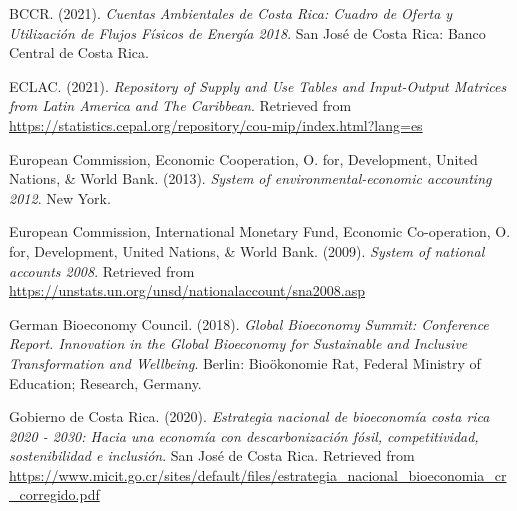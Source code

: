 \documentclass[
  letterpaper,
  DIV=11,
  numbers=noendperiod]{scrartcl}
\newlength{\cslhangindent}
\newenvironment{CSLReferences}[2] %
 {\begin{list}{}{%
  \setlength{\itemindent}{0pt}
  \setlength{\leftmargin}{0pt}
  \setlength{\parsep}{0pt}
  \ifodd #1
   \setlength{\leftmargin}{\cslhangindent}
   \setlength{\itemindent}{-1\cslhangindent}
  \fi
  \setlength{\itemsep}{#2\baselineskip}}}
 {\end{list}}
\begin{document}
\label{refs}
\begin{CSLReferences}{1}{0}
BCCR. (2021). \emph{Cuentas {Ambientales} de {Costa} {Rica}: {Cuadro} de
{Oferta} y {Utilización} de {Flujos} {Físicos} de {Energía} 2018}. San
José de Costa Rica: Banco Central de Costa Rica.

ECLAC. (2021). \emph{{Repository} of {Supply} and {Use Tables} and
{Input-Output Matrices} from {Latin America} and {The Caribbean}}.
Retrieved from
\url{https://statistics.cepal.org/repository/cou-mip/index.html?lang=es}

European Commission, Economic Cooperation, O. for, Development, United
Nations, \& World Bank. (2013). \emph{System of environmental-economic
accounting 2012}. New York.

European Commission, International Monetary Fund, Economic Co-operation,
O. for, Development, United Nations, \& World Bank. (2009). \emph{System
of national accounts 2008}. Retrieved from
\url{https://unstats.un.org/unsd/nationalaccount/sna2008.asp}

German Bioeconomy Council. (2018). \emph{Global {Bioeconomy} {Summit}:
{Conference} {Report}. {Innovation} in the {Global} {Bioeconomy} for
{Sustainable} and {Inclusive} {Transformation} and {Wellbeing}}. Berlin:
Bioökonomie Rat, Federal Ministry of Education; Research, Germany.

Gobierno de Costa Rica. (2020). \emph{Estrategia nacional de bioeconomía
costa rica 2020 - 2030: Hacia una economía con descarbonización fósil,
competitividad, sostenibilidad e inclusión}. San José de Costa Rica.
Retrieved from
\url{https://www.micit.go.cr/sites/default/files/estrategia_nacional_bioeconomia_cr_corregido.pdf}

\end{CSLReferences}
\end{document}
